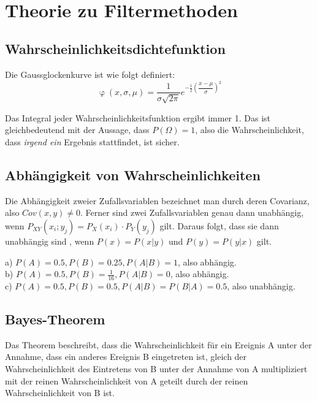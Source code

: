 \documentclass{../Vorlage/mat}
\begin{document}
 \\

\section{Theorie zu Filtermethoden}
\subsection*{Wahrscheinlichkeitsdichtefunktion}
Die Gaussglockenkurve ist wie folgt definiert:
\begin{equation}
	\upvarphi(x, \sigma, \mu) = \dfrac{1}{\sigma\sqrt{2\pi}}e^{-\frac{1}{2}\left(\dfrac{x-\mu}{\sigma}\right)^2}
\end{equation}

Das Integral jeder Wahrscheinlichkeitsfunktion ergibt immer 1. Das ist gleichbedeutend mit der Aussage, dass $P(\Omega) = 1$, also die Wahrscheinlichkeit, dass \textit{irgend ein} Ergebnis stattfindet, ist sicher.

\subsection*{Abhängigkeit von Wahrscheinlichkeiten}

Die Abhängigkeit zweier Zufallsvariablen bezeichnet man durch deren Covarianz, also $Cov(x,y) \neq 0$. Ferner sind zwei Zufallsvariablen genau dann unabhängig, wenn $P_{XY}(x_i;y_j) = P_X(x_i)\cdot P_Y(y_j)$ gilt. Daraus folgt, dass sie dann unabhängig sind , wenn $P(x) = P(x | y)$ und $P(y) = P(y | x)$ gilt.

a) 
$P(A) = 0.5 , P(B) = 0.25, P(A|B) = 1$, also abhängig.\\
b)
$P(A) = 0.5, P(B) = \frac{1}{16}, P(A|B) = 0$, also abhängig.\\
c)
$P(A) = 0.5, P(B) = 0.5, P(A|B) = P(B|A) = 0.5$, also unabhängig.

\subsection*{Bayes-Theorem}
Das Theorem beschreibt, dass die Wahrscheinlichkeit für ein Ereignis A unter der Annahme, dass ein anderes Ereignis B eingetreten ist, gleich der Wahrscheinlichkeit des Eintretens von B unter der Annahme von A multipliziert mit der reinen Wahrscheinlichkeit von A geteilt durch der reinen Wahrscheinlichkeit von B ist.
\end{document}
